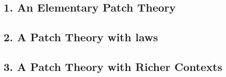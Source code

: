 \documentclass{beamer}
\begin{document}
\subsection{1. An Elementary Patch Theory}
\begin{frame}
\end{frame}

\subsection{2. A Patch Theory with laws}
\begin{frame}
\end{frame}

\subsection{3. A Patch Theory with Richer Contexts}
\begin{frame}
\end{frame}


\end{document}
